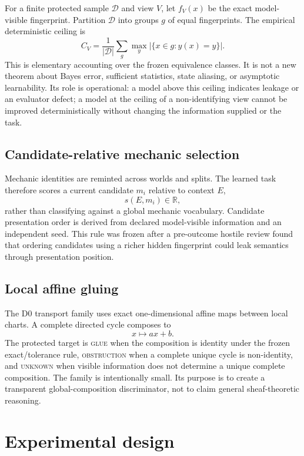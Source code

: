 \documentclass[10pt]{article}
\begin{document}
For a finite protected sample $\mathcal{D}$ and view $V$, let $f_V(x)$ be the exact model-visible fingerprint. Partition $\mathcal{D}$ into groups $g$ of equal fingerprints. The empirical deterministic ceiling is
\[
C_V = \frac{1}{|\mathcal{D}|}\sum_g \max_y |\{x\in g : y(x)=y\}|.
\]
This is elementary accounting over the frozen equivalence classes. It is not a new theorem about Bayes error, sufficient statistics, state aliasing, or asymptotic learnability. Its role is operational: a model above this ceiling indicates leakage or an evaluator defect; a model at the ceiling of a non-identifying view cannot be improved deterministically without changing the information supplied or the task.

\subsection{Candidate-relative mechanic selection}

Mechanic identities are reminted across worlds and splits. The learned task therefore scores a current candidate $m_i$ relative to context $E$,
\[
s(E,m_i) \in \mathbb{R},
\]
rather than classifying against a global mechanic vocabulary. Candidate presentation order is derived from declared model-visible information and an independent seed. This rule was frozen after a pre-outcome hostile review found that ordering candidates using a richer hidden fingerprint could leak semantics through presentation position.

\subsection{Local affine gluing}

The D0 transport family uses exact one-dimensional affine maps between local charts. A complete directed cycle composes to
\[
x \mapsto ax+b.
\]
The protected target is \textsc{glue} when the composition is identity under the frozen exact/tolerance rule, \textsc{obstruction} when a complete unique cycle is non-identity, and \textsc{unknown} when visible information does not determine a unique complete composition. The family is intentionally small. Its purpose is to create a transparent global-composition discriminator, not to claim general sheaf-theoretic reasoning.

\section{Experimental design}
\end{document}
